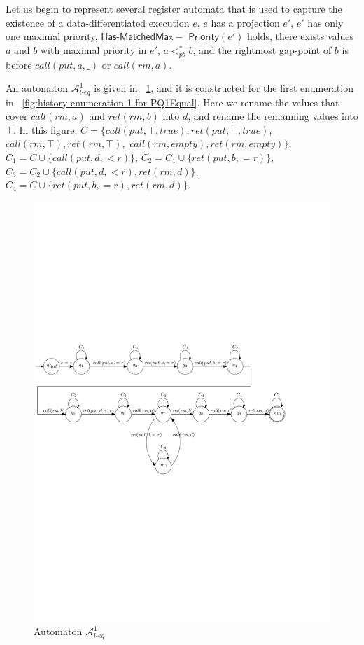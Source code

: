 Let us begin to represent several register automata that is used to capture the existence of a data-differentiated execution $e$, $e$ has a projection $e'$, $e'$ has only one maximal priority, $\mathsf{Has\text{-}MatchedMax-}$ $\mathsf{Priority}(e')$ holds, there exists values $a$ and $b$ with maximal priority in $e'$, $a <_{\textit{pb}}^* b$, and the rightmost gap-point of $b$ is before $\textit{call}(\textit{put},a,\_)$ or $\textit{call}(\textit{rm},a)$.


An automaton $\mathcal{A}_{\textit{l-eq}}^1$ is given in \figurename~\ref{fig:automata for first enumeration of PQ1Equal}, and it is constructed for the first enumeration in \figurename~\ref{fig:history enumeration 1 for PQ1Equal}. Here we rename the values that cover $\textit{call}(\textit{rm},a)$ and $\textit{ret}(\textit{rm},b)$ into $d$, and rename the remanning values into $\top$. In this figure, $C = \{ \textit{call}(\textit{put},\top,\textit{true}),\textit{ret}(\textit{put},\top,\textit{true})$, $\textit{call}(\textit{rm},\top), \textit{ret}(\textit{rm},\top),$ $\textit{call}(\textit{rm},\textit{empty}),\textit{ret}(\textit{rm},\textit{empty}) \}$, $C_1 = C \cup \{ \textit{call}(\textit{put},d,<r) \}$, $C_2 = C_1 \cup \{ \textit{ret}(\textit{put},b,=r) \}$, $C_3 = C_2 \cup \{ \textit{call}(\textit{put},d,<r),\textit{ret}(\textit{rm},d) \}$, $C_4 = C \cup \{ \textit{ret}(\textit{put},b,=r), \textit{ret}(\textit{rm},d) \}$.

\begin{figure}[htbp]
  \centering
  \includegraphics[width=0.8 \textwidth]{figures/PIC_AUTO_PQ1Equ-1.pdf}
  \caption{Automaton $\mathcal{A}_{\textit{l-eq}}^1$}
  \label{fig:automata for first enumeration of PQ1Equal}
\end{figure}


